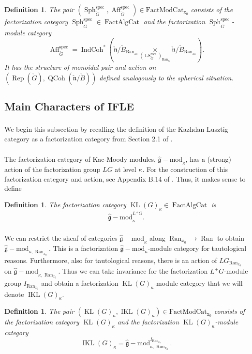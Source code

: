 \documentclass[10pt,a4paper]{amsart}
\newtheorem{defn}[subsubsection]{Definition}
\newcommand{\on}[1]{\operatorname{#1}}
\newcommand{\QCoh}{\on{QCoh}}
\newcommand{\IndCoh}{\on{IndCoh}}
\newcommand{\gmod}{\on{\hat{\mathfrak{g}}-mod}}
\newcommand{\Gcheck}{\check{G}}
\newcommand{\ncheck}{\check{\mathfrak{n}}}
\newcommand{\Bcheck}{\check{B}}
\newcommand{\Ran}{\on{Ran}}
\newcommand{\FactAlgCat}{\on{FactAlgCat}}
\newcommand{\FactModCat}{\on{FactModCat_{x_0}}}
\newcommand{\sssec}[1]{\subsubsection{}}
\begin{document}
\begin{defn}
    The pair $(\on{Sph}_{\Gcheck}^{\on{spec}}, \on{Aff}_{\Gcheck}^{\on{spec}}) \in \FactModCat$ consists of the factorization category $\on{Sph}_{\Gcheck}^{\on{spec}} \in \FactAlgCat$ and the factorization $\on{Sph}_{\Gcheck}^{\on{spec}}$-module category
    $$
    \on{Aff}_{\Gcheck}^{\on{spec}} = \IndCoh^*(\ncheck/\Bcheck_{\Ran_{x_0}} \underset{(\on{LS}_{\Gcheck}^{\on{mer}})_{\Ran_{x_0}}}{\times} \ncheck/\Bcheck_{\Ran_{x_0}}).
    $$
    It has the structure of monoidal pair and action on $(\on{Rep}(\Gcheck), \QCoh(\ncheck/\Bcheck))$ defined analogously to the spherical situation.
\end{defn}

\subsection{Main Characters of IFLE} \label{Main Characters of IFLE}

\sssec{}
We begin this subsection by recalling the definition of the Kazhdan-Lusztig category as a factorization category from Section 2.1 of \cite{GLC2}.

\sssec{}
The factorization category of Kac-Moody modules, $\gmod_{\kappa}$, has a (strong) action of the factorization group $LG$ at level $\kappa$. For the construction of this factorization category and action, see Appendix B.14 of \cite{GLC2}. Thus, it makes sense to define

\begin{defn}
    The factorization category $\on{KL}(G)_{\kappa} \in \FactAlgCat$ is
    $$
        \gmod_{\kappa}^{L^+G}.
    $$
\end{defn}

\sssec{}
We can restrict the sheaf of categories $\gmod_{\kappa}$ along $\Ran_{x_0} \to \Ran$ to obtain $\gmod_{\kappa, \Ran_{x_0}}$. This is a factorization $\gmod_{\kappa}$-module category for tautological reasons. Furthermore, also for tautological reasons, there is an action of $LG_{\Ran_{x_0}}$ on $\gmod_{\kappa, \Ran_{x_0}}$. Thus we can take invariance for the factorization $L^+G$-module group $I_{\Ran_{x_0}}$ and obtain a factorization $\on{KL}(G)_{\kappa}$-module category that we will denote $\on{IKL}(G)_{\kappa}$.

\begin{defn}
    The pair $(\on{KL}(G)_{\kappa}, \on{IKL}(G)_{\kappa}) \in \FactModCat$ consists of the factorization category $\on{KL}(G)_{\kappa}$ and the factorization $\on{KL}(G)_{\kappa}$-module category
    $$
    \on{IKL}(G)_{\kappa} = \gmod_{\kappa, \Ran_{x_0}}^{I_{\Ran_{x_0}}}.
    $$
\end{defn}
\end{document}
